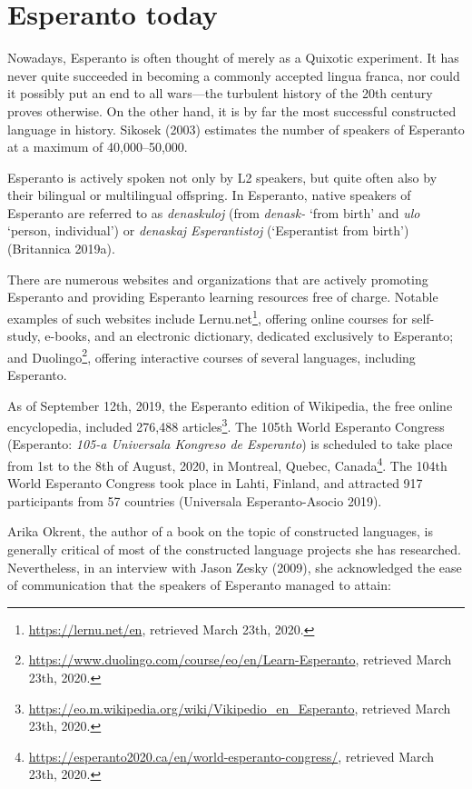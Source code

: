 \section{Esperanto today}
Nowadays, Esperanto is often thought of merely as a Quixotic experiment.
It has never quite succeeded in becoming a commonly accepted lingua franca, nor could it possibly put an end to all wars---the turbulent history of the 20th century proves otherwise.
On the other hand, it is by far the most successful constructed language in history.
Sikosek (2003) estimates the number of speakers of Esperanto at a maximum of 40,000--50,000.

Esperanto is actively spoken not only by L2 speakers, but quite often also by their bilingual or multilingual offspring.
In Esperanto, native speakers of Esperanto are referred to as \textit{denaskuloj} (from \textit{denask-} `from birth' and \textit{ulo} `person, individual') or \textit{denaskaj Esperantistoj} (`Esperantist from birth')
(Britannica 2019a).

There are numerous websites and organizations that are actively promoting Esperanto and providing Esperanto learning resources free of charge.
Notable examples of such websites include Lernu.net\footnote{\url{https://lernu.net/en}, retrieved March 23th, 2020.}, offering online courses for self-study, e-books, and an electronic dictionary, dedicated exclusively to Esperanto; and Duolingo\footnote{\url{https://www.duolingo.com/course/eo/en/Learn-Esperanto}, retrieved March 23th, 2020.}, offering interactive courses of several languages, including Esperanto.

As of September 12th, 2019, the Esperanto edition of Wikipedia, the free online encyclopedia, included 276,488 articles\footnote{\url{https://eo.m.wikipedia.org/wiki/Vikipedio_en_Esperanto}, retrieved March 23th, 2020.}.
The 105th World Esperanto Congress (Esperanto: \textit{105-a Universala Kongreso de Esperanto}) is scheduled to take place from 1st to the 8th of August, 2020, in Montreal, Quebec, Canada\footnote{\url{https://esperanto2020.ca/en/world-esperanto-congress/}, retrieved March 23th, 2020.}.
The 104th World Esperanto Congress took place in Lahti, Finland, and attracted 917 participants from 57 countries (Universala Esperanto-Asocio 2019).


Arika Okrent, the author of a book on the topic of constructed languages, is generally critical of most of the constructed language projects she has researched.
Nevertheless, in an interview with Jason Zesky (2009), she acknowledged the ease of communication that the speakers of Esperanto managed to attain:

